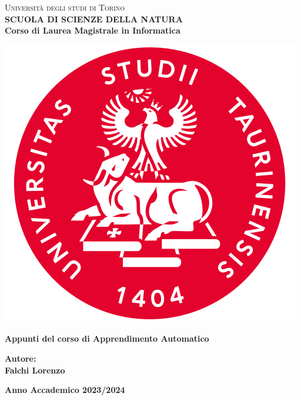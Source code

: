 \begin{titlepage}
\begin{center}
{{\Large{\textsc{Universit\`a degli studi di Torino \\}}}} \vspace{5mm} {\small{\bf SCUOLA DI SCIENZE DELLA NATURA\\ \vspace{3mm}
Corso di Laurea Magistrale in Informatica}}
\vspace{5mm}
\end{center}
\begin{center}
\includegraphics[scale=.3]{head/logo.png}
\end{center}
\begin{center}
\vspace{5mm}
{\LARGE{\bf Appunti del corso di Apprendimento Automatico}}
\end{center}
\hfill
\begin{minipage}[t]{0.47\textwidth}\raggedleft
\vspace{20mm}
{\large{\bf Autore:\\
Falchi Lorenzo}}
\end{minipage}
\vspace{10mm}
\begin{center}
{\large{\bf 
Anno Accademico 2023/2024}}
\end{center}

\end{titlepage}
\newpage\null\thispagestyle{empty}\newpage
